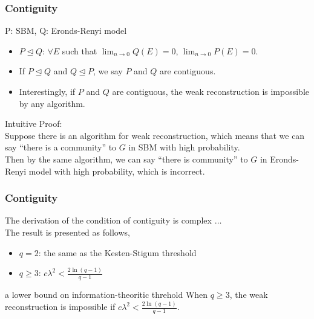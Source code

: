 \documentclass[dvipdfmx,11pt]{beamer}
\begin{document}
\begin{frame}
  \frametitle{Contiguity}
  P: SBM, Q: Eronds-Renyi model
  \begin{itemize}
    \item $P \trianglelefteq Q$: $\forall E$ such that $\lim_{n \to 0} Q(E) = 0$, $\lim_{n \to 0} P(E) = 0$.
    \item If $P \trianglelefteq Q$ and $Q \trianglelefteq P$, we say $P$ and $Q$ are \alert{contiguous}.
    \item Interestingly, if $P$ and $Q$ are contiguous, the weak reconstruction is impossible by any algorithm.
  \end{itemize}
  \alert{Intuitive Proof}: \\
  Suppose there is an algorithm for weak reconstruction, which means that we can say ``there is a community'' to $G$ in SBM with high probability. \\
  Then by the same algorithm, we can say ``there is community'' to $G$ in Eronds-Renyi model with high probability, which is incorrect.   
\end{frame}

\begin{frame}
  \frametitle{Contiguity}
  The derivation of the condition of contiguity is complex $\dots$ \\
  The result is presented as follows,
  \begin{itemize}
    \item $q = 2$: the same as the Kesten-Stigum threshold
    \item $q \geq 3$: $c\lambda^2 < \frac{2\ln(q-1)}{q-1}$ 
  \end{itemize}

  \begin{block}{a lower bound on information-theoritic threhold}
    When $q \geq 3$, the weak reconstruction is impossible if $c\lambda^2 < \frac{2\ln(q-1)}{q-1}$.
  \end{block}


\end{frame}
\end{document}
